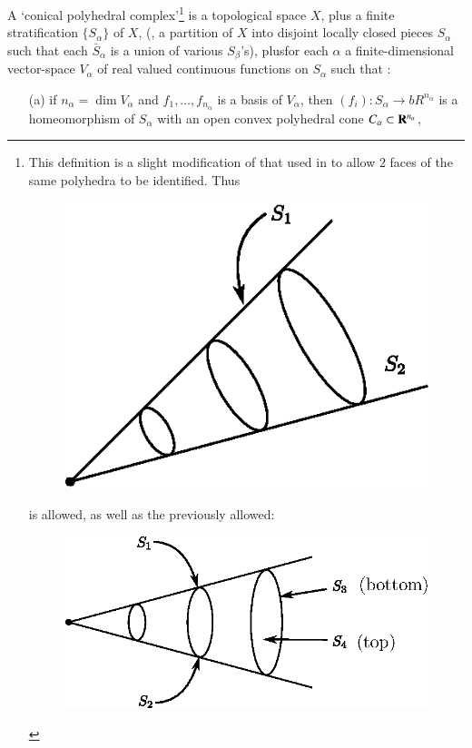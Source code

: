 \begin{defi*}
A `conical polyhedral complex'\footnote{This definition is a slight modification of that used in \cite{art8-key8} to allow 2 faces of the same polyhedra to be identified. Thus
\begin{figure}[H]
\centering
\includegraphics[scale=0.8]{221a.eps}
\end{figure}
is allowed, as well as the previously allowed:
\begin{figure}[H]
\centering
\includegraphics[scale=0.8]{221b.eps}
\end{figure}}
is a topological space $X$, plus a finite stratification $\{S_\alpha\}$ of $X$, (\ie, a partition of $X$ into disjoint locally closed pieces $S_\alpha$ such that each $\bar{S}_\alpha$ is a union of various $S_\beta$'s), plus\pageoriginale for each $\alpha$ a finite-dimensional vector-space $V_\alpha$ of real valued continuous functions on $S_\alpha$ such that :
\begin{itemize}
\item[(a)] if $n_\alpha = \dim V_\alpha$ and $f_1, \ldots, f_{n_\alpha}$ is a basis of $V_\alpha$, then $(f_i) : S_\alpha \to bR^{n_\alpha}$ is a homeomorphism of $S_\alpha$ with an open convex polyhedral cone $C_\alpha \subset \mathbf{R}^{n_\alpha}$,


\end{itemize}
\end{defi*}
